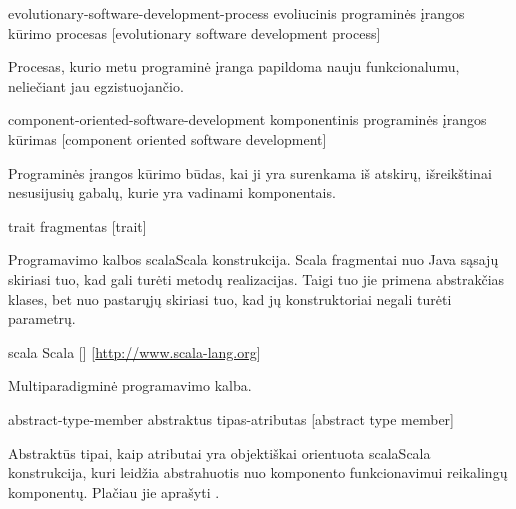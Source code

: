 
\begin{glossary}

  \begin{entry}%
    {evolutionary-software-development-process}%
    {evoliucinis programinės įrangos kūrimo procesas}%
    [evolutionary software development process]

    Procesas, kurio metu programinė įranga papildoma nauju funkcionalumu,
    neliečiant jau egzistuojančio.
    
  \end{entry}

  \begin{entry}%
    {component-oriented-software-development}%
    {komponentinis programinės įrangos kūrimas}%
    [component oriented software development]

    Programinės įrangos kūrimo būdas, kai ji yra surenkama iš atskirų,
    išreikštinai nesusijusių gabalų, kurie yra vadinami komponentais.
    
  \end{entry}

  \begin{entry}%
    {trait}%
    {fragmentas}%
    [trait]

    Programavimo kalbos \gls{scala}{Scala} konstrukcija. Scala
    fragmentai nuo Java sąsajų skiriasi tuo, kad gali turėti metodų
    realizacijas. Taigi tuo jie primena abstrakčias klases, bet nuo
    pastarųjų skiriasi tuo, kad jų konstruktoriai negali turėti
    parametrų.
  
  \end{entry}

  \begin{entry}%
    {scala}%
    {Scala}%
    []%
    [\url{http://www.scala-lang.org}]

    Multiparadigminė programavimo kalba.
    
  \end{entry}

  \begin{entry}%
    {abstract-type-member}%
    {abstraktus tipas-atributas}%
    [abstract type member]

    Abstraktūs tipai, kaip atributai yra objektiškai orientuota
    \gls{scala}{Scala} konstrukcija, kuri leidžia abstrahuotis nuo
    komponento funkcionavimui reikalingų komponentų. Plačiau
    jie aprašyti \cite[8]{scala-overview}.
    
  \end{entry}


\end{glossary}
